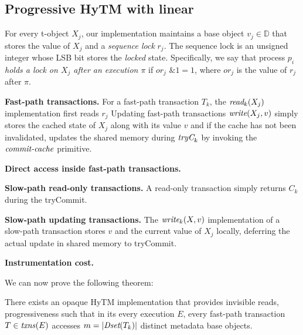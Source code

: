 \subsection{Progressive HyTM with linear}
\label{sec:hytm1}
%

%
For every t-object $X_j$, our implementation maintains a base object $v_j\in \mathbb{D}$ that stores the value of $X_j$
and a \emph{sequence lock} $r_{j}$. The sequence lock is an unsigned integer whose LSB bit stores the \emph{locked} state.
Specifically, we say that process $p_i$ \emph{holds a lock on $X_j$ after an execution $\pi$} if
$\textit{or}_j$ $\mathrel{\&} 1=1$, where $\textit{or}_j$ is the value of $r_j$ after $\pi$.


\vspace{1mm}\noindent\textbf{Fast-path transactions.}
For a fast-path transaction $T_k$, the $\textit{read}_k(X_j)$ implementation first reads $r_j$ 
Updating fast-path transactions 
$\textit{write} (X_j,v)$ simply stores the cached state of $X_j$ along with its value $v$ and
if the cache has not been invalidated, updates the shared memory
during $\textit{tryC}_k$ by invoking the $\ms{commit-cache}$ primitive.

\vspace{1mm}\noindent\textbf{Direct access inside fast-path transactions.}

\vspace{1mm}\noindent\textbf{Slow-path read-only transactions.}
A read-only transaction simply returns $C_k$ during the tryCommit.

\vspace{1mm}\noindent\textbf{Slow-path updating transactions.}
The $\textit{write}_k(X,v)$ implementation of a slow-path transaction stores
$v$ and the current value of $X_j$ locally, 
deferring the actual update in shared memory to tryCommit. 


\vspace{1mm}\noindent\textbf{Instrumentation cost.}
%

We can now prove the following theorem:
%
\begin{theorem}
\label{th:inswrite}
There exists an opaque HyTM implementation that provides invisible reads, progressiveness
such that
in its every execution $E$, every fast-path transaction $T\in \ms{txns}(E)$
accesses $m=|\textit{Dset}(T_k)|$ distinct metadata base objects.
\end{theorem}
%
\begin{proofsketch}

\end{proofsketch}
%
%

